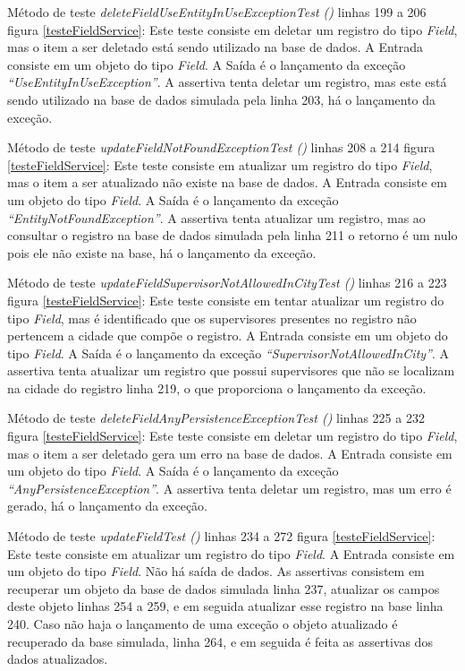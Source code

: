 Método de teste \textit{ deleteFieldUseEntityInUseExceptionTest ()} linhas 199 a 206 figura \ref{testeFieldService}: Este teste consiste em deletar um registro do tipo \textit{Field}, mas o item a ser deletado está sendo utilizado na base de dados. A Entrada consiste em um objeto do tipo \textit{Field}. A Saída é o lançamento da exceção \textit{“UseEntityInUseException”}. A assertiva tenta deletar um registro, mas este está sendo utilizado na base de dados simulada pela linha 203, há o lançamento da exceção.  

Método de teste \textit{ updateFieldNotFoundExceptionTest ()} linhas 208 a 214 figura \ref{testeFieldService}: Este teste consiste em atualizar um registro do tipo \textit{Field}, mas o item a ser atualizado não existe na base de dados. A Entrada consiste em um objeto do tipo \textit{Field}. A Saída é o lançamento da exceção \textit{“EntityNotFoundException”}. A assertiva tenta atualizar um registro, mas ao consultar o registro na base de dados simulada pela linha 211 o retorno é um nulo pois ele não existe na base, há o lançamento da exceção.  

Método de teste \textit{ updateFieldSupervisorNotAllowedInCityTest ()} linhas 216 a 223 figura \ref{testeFieldService}: Este teste consiste em tentar atualizar um registro do tipo \textit{Field}, mas é identificado que os supervisores presentes no registro não pertencem a cidade que compõe o registro. A Entrada consiste em um objeto do tipo \textit{Field}. A Saída é o lançamento da exceção \textit{“SupervisorNotAllowedInCity”}. A assertiva tenta atualizar um registro que possui supervisores que não se localizam na cidade do registro linha 219, o que proporciona o lançamento da exceção.  


Método de teste \textit{ deleteFieldAnyPersistenceExceptionTest ()} linhas 225 a 232 figura \ref{testeFieldService}: Este teste consiste em deletar um registro do tipo \textit{Field}, mas o item a ser deletado gera um erro na base de dados. A Entrada consiste em um objeto do tipo \textit{Field}. A Saída é o lançamento da exceção \textit{“AnyPersistenceException”}. A assertiva tenta deletar um registro, mas um erro é gerado, há o lançamento da exceção.  

Método de teste \textit{ updateFieldTest ()} linhas 234 a 272 figura \ref{testeFieldService}: Este teste consiste em atualizar um registro do tipo \textit{Field}. A Entrada consiste em um objeto do tipo \textit{Field}. Não há saída de dados. As assertivas consistem em recuperar um objeto da base de dados simulada linha 237, atualizar os campos deste objeto linhas 254 a 259, e em seguida atualizar esse registro na base linha 240. Caso não haja o lançamento de uma exceção o objeto atualizado é recuperado da base simulada, linha 264, e em seguida é feita as assertivas dos dados atualizados.

